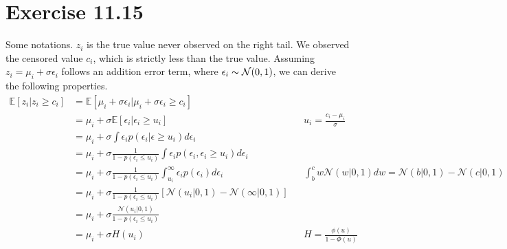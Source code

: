 \documentclass[11pt, letterpaper]{article}
\begin{document}
\section{Exercise 11.15}
Some notations. $z_i$ is the true value never observed on the right tail. We observed the censored value $c_i$, which is strictly less than the true value. Assuming $z_i = \mu_i + \sigma \epsilon_i$ follows an addition error term, where $\epsilon_i \thicksim \mathcal{N}(0, 1)$, we can derive the following properties.
\begin{align*}
    \mathbb{E}[z_i|z_i \geq c_i] &= \mathbb{E}[\mu_i + \sigma \epsilon_i|\mu_i + \sigma \epsilon_i \geq c_i] \\
        &= \mu_i + \sigma \mathbb{E}[\epsilon_i | \epsilon_i \geq u_i] && u_i = \frac{c_i-\mu_i}{\sigma} \\
        &= \mu_i + \sigma \int \epsilon_i p(\epsilon_i|\epsilon \geq u_i) d\epsilon_i \\
        &= \mu_i + \sigma \frac{1}{1 - p(\epsilon_i \leq u_i)} \int \epsilon_i p(\epsilon_i, \epsilon_i \geq u_i) d\epsilon_i \\
        &= \mu_i + \sigma \frac{1}{1 - p(\epsilon_i \leq u_i)} \int_{u_i}^{\infty} \epsilon_i p(\epsilon_i) d\epsilon_i
            && \int_b^c w\mathcal{N}(w|0,1) dw = \mathcal{N}(b|0, 1) - \mathcal{N}(c|0, 1) \\
        &= \mu_i + \sigma \frac{1}{1 - p(\epsilon_i \leq u_i)} [\mathcal{N}(u_i|0, 1) - \mathcal{N}(\infty|0, 1)] \\
        &= \mu_i + \sigma \frac{\mathcal{N}(u_i|0, 1)}{1 - p(\epsilon_i \leq u_i)} \\
        &= \mu_i + \sigma H(u_i) && H = \frac{\phi(u)}{1 - \Phi(u)} \\
\end{align*}
\end{document}

